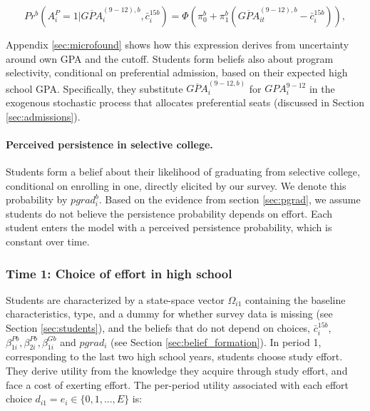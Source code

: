 \vspace{-10pt}
\begin{equation}\label{eq:pr_Pb}
    Pr^b(A^P_i=1|\overline{GPA}^{(9-12),b}_{i},\bar{c}_i^{15b})=\Phi\left(\pi_0^b+\pi_1^b (\overline{GPA}^{(9-12),b}_{it}-\bar{c}_i^{15b})\right),
\end{equation}



\noindent Appendix \ref{sec:microfound} shows how this expression derives from uncertainty around own GPA and the cutoff. Students form beliefs also about program selectivity, conditional on preferential admission, based on their expected high school GPA. Specifically, they substitute $\overline{GPA}_i^{(9-12,b)}$ for $GPA_i^{9-12}$ in the exogenous stochastic process that allocates preferential seats (discussed in Section \ref{sec:admissions}).\par 

 

\paragraph{Perceived persistence in selective college.} Students form a belief about their likelihood of graduating from selective college, conditional on enrolling in one, directly elicited by our survey. We denote this probability by $pgrad_i^b$. Based on the evidence from section \ref{sec:pgrad}, we assume students do not believe the persistence probability depends on effort. Each student enters the model with a perceived persistence probability, which is constant over time. \par 





\subsubsection{Time 1: Choice of effort in high school}\label{sec:time1}
Students are characterized by a state-space vector $\Omega_{i1}$ containing the baseline characteristics, type, and a dummy for whether survey data is missing (see Section \ref{sec:students}), and the beliefs that do not depend on choices, $\bar{c}^{15b}_i$, $\beta_{1i}^{Pb},\beta_{2i}^{Pb}, \beta_{1i}^{Gb}$ and $pgrad_i$ (see Section \ref{sec:belief_formation}). In period 1, corresponding to the last two high school years, students choose study effort. They derive utility from the knowledge they acquire through study effort, and face a cost of exerting effort. The per-period utility associated with each effort choice $d_{i1}=e_i\in\{0, 1, ..., E\}$ is:

